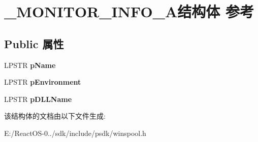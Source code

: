 \hypertarget{struct___m_o_n_i_t_o_r___i_n_f_o__2_a}{}\section{\+\_\+\+M\+O\+N\+I\+T\+O\+R\+\_\+\+I\+N\+F\+O\+\_\+A结构体 参考}
\label{struct___m_o_n_i_t_o_r___i_n_f_o__2_a}
\subsection*{Public 属性}
\begin{DoxyCompactItemize}
\item 
\mbox{\label{struct___m_o_n_i_t_o_r___i_n_f_o__2_a_aa25826a616cb159a4dccd5945e3c17cf}} 
L\+P\+S\+TR {\bfseries p\+Name}
\item 
\mbox{\label{struct___m_o_n_i_t_o_r___i_n_f_o__2_a_a9f90949a86f798242ad215dbcc097bd0}} 
L\+P\+S\+TR {\bfseries p\+Environment}
\item 
\mbox{\label{struct___m_o_n_i_t_o_r___i_n_f_o__2_a_a2ef396f035092e93247128b91abb8015}} 
L\+P\+S\+TR {\bfseries p\+D\+L\+L\+Name}
\end{DoxyCompactItemize}


该结构体的文档由以下文件生成\+:\begin{DoxyCompactItemize}
\item 
E\+:/\+React\+O\+S-\/0../sdk/include/psdk/winspool.\+h\end{DoxyCompactItemize}
